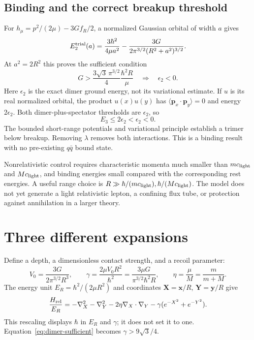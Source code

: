 \subsection{Binding and the correct breakup threshold}
For $h_\mu=p^2/(2\mu)-3Gf_R/2$, a normalized Gaussian orbital of width $a$ gives
\begin{equation}
 E_2^{\rm trial}(a)=\frac{3\hbar^2}{4\mu a^2}
   -\frac{3G}{2\pi^{3/2}(R^2+a^2)^{3/2}}.
\end{equation}
At $a^2=2R^2$ this proves the sufficient condition
\begin{equation}
 \boxed{G>\frac{3\sqrt3\,\pi^{3/2}}{4}\frac{\hbar^2R}{\mu}
 \quad\Longrightarrow\quad \epsilon_2<0 .}
 \label{eq:dimer-sufficient}
\end{equation}
Here $\epsilon_2$ is the exact dimer ground energy, not its variational estimate. If $u$ is its real normalized orbital, the product $u(x)u(y)$ has
$\langle\mathbf p_x\cdot\mathbf p_y\rangle=0$ and energy $2\epsilon_2$. Both dimer-plus-spectator thresholds are $\epsilon_2$, so
\begin{equation}
 \boxed{E_3\leq2\epsilon_2<\epsilon_2<0.}
 \label{eq:binding}
\end{equation}
The bounded short-range potentials and variational principle establish a trimer below breakup. Removing $\lambda$ removes both interactions. This is a binding result with no pre-existing $q\bar q$ bound state.

Nonrelativistic control requires characteristic momenta much smaller than $mc_{\rm light}$ and $Mc_{\rm light}$, and binding energies small compared with the corresponding rest energies. A useful range choice is $R\gg\hbar/(mc_{\rm light}),\hbar/(Mc_{\rm light})$. The model does not yet generate a light relativistic lepton, a confining flux tube, or protection against annihilation in a larger theory.

\section{Three different expansions}
Define a depth, a dimensionless contact strength, and a recoil parameter:
\begin{equation}
 V_0=\frac{3G}{2\pi^{3/2}R^3},\qquad
 \gamma=\frac{2\mu V_0R^2}{\hbar^2}
       =\frac{3\mu G}{\pi^{3/2}\hbar^2R},\qquad
 \eta=\frac{\mu}{M}=\frac{m}{m+M}.
 \label{eq:parameters}
\end{equation}
The energy unit $E_R=\hbar^2/(2\mu R^2)$ and coordinates
$\mathbf X=\mathbf x/R$, $\mathbf Y=\mathbf y/R$ give
\begin{equation}
 \frac{H_{\rm rel}}{E_R}
 =-\nabla_X^2-\nabla_Y^2-2\eta\nabla_X\cdot\nabla_Y
   -\gamma(e^{-X^2}+e^{-Y^2}).
\end{equation}
This rescaling displays $\hbar$ in $E_R$ and $\gamma$; it does not set it to one. Equation~\eqref{eq:dimer-sufficient} becomes $\gamma>9\sqrt3/4$.

